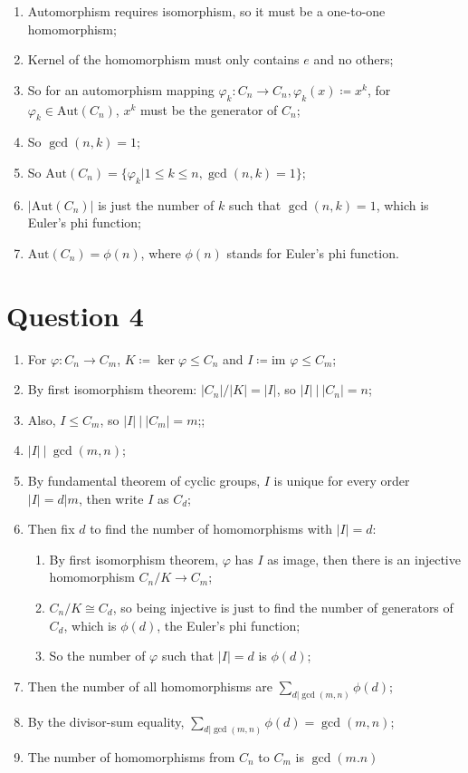 \documentclass{article}
\newcommand{\im}{\text{im }}
\begin{document}
\begin{enumerate}
    \item Automorphism requires isomorphism, so it must be a one-to-one homomorphism;
    \item Kernel of the homomorphism must only contains $e$ and no others;
    \item So for an automorphism mapping $ \varphi_k: C_n\to C_n, \varphi_k(x)\coloneqq x^k$, for $\varphi_k\in \text{Aut}(C_n)$, $x^k$ must be the generator of $C_n$;
    \item So $\gcd(n,k)=1$;
    \item So $\text{Aut}(C_n)=\{\varphi_k|1\leq k\leq n,\gcd(n,k)=1\}$;
    \item $|\text{Aut}(C_n)|$ is just the number of $k$ such that $\gcd(n,k)=1$, which is Euler's phi function;
    \item $\text{Aut}(C_n)=\phi(n)$, where $\phi(n)$ stands for Euler's phi function.
\end{enumerate}

\newpage

\section*{Question 4}

\begin{enumerate}
    \item For $\varphi:C_n\to C_m$, $K\coloneqq \ker\varphi\leq C_n$ and $I\coloneqq \im \varphi\leq C_m$;
    \item By first isomorphism theorem: $|C_n|/|K|=|I|$, so $|I|\ |\ |C_n|=n$;
    \item Also, $I\leq C_m$, so $|I| \ |\ |C_m|=m$;;
    \item $|I|\ |\ \gcd(m,n)$;
    \item By fundamental theorem of cyclic groups, $I$ is unique for every order $|I|=d|m$, then write $I$ as $C_d$;
    \item Then fix $d$ to find the number of homomorphisms with $|I|=d$:
    \begin{enumerate}
        \item  By first isomorphism theorem, $\varphi$ has $I$ as image, then there is an injective homomorphism $C_n/K\to C_m$; 
        \item $C_n/K\cong C_d$, so being injective is just to find the number of generators of $C_d$, which is $\phi(d)$, the Euler's phi function;
        \item So the number of $\varphi$ such that $|I|=d$ is $\phi(d)$;
    \end{enumerate}
    \item Then the number of all homomorphisms are $\sum_{d|\gcd(m,n)}\phi(d)$;
    \item By the divisor-sum equality, $\sum_{d|\gcd(m,n)}\phi(d)=\gcd(m,n)$;
    \item The number of homomorphisms from $C_n$ to $C_m$ is $\gcd(m.n)$
\end{enumerate}
\end{document}
